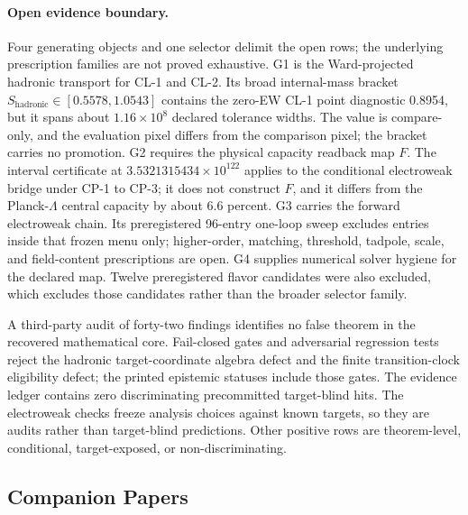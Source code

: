 \documentclass[11pt]{article}
\begin{document}
\paragraph{Open evidence boundary.}
Four generating objects and one selector delimit the open rows; the underlying prescription
families are not proved exhaustive. G1 is the
Ward-projected hadronic transport for CL-1 and CL-2. Its broad internal-mass bracket
\(S_{\mathrm{hadronic}}\in[0.5578,1.0543]\) contains the zero-EW CL-1 point diagnostic 0.8954,
but it spans about \(1.16\times10^8\) declared tolerance widths. The value is compare-only,
and the evaluation pixel differs from the comparison pixel; the bracket carries no promotion.
G2 requires the physical capacity readback map \(F\). The interval
certificate at \(3.5321315434\times10^{122}\) applies to the conditional electroweak bridge under
CP-1 to CP-3; it does not construct \(F\), and it differs from the Planck-\(\Lambda\) central
capacity by about \(6.6\) percent. G3 carries the forward electroweak chain. Its preregistered
96-entry one-loop sweep excludes entries inside that frozen menu only; higher-order, matching,
threshold, tadpole, scale, and field-content prescriptions are open. G4 supplies numerical
solver hygiene for the declared map. Twelve preregistered flavor candidates were also excluded,
which excludes those candidates rather than the broader selector family.

A third-party audit of forty-two findings identifies no false theorem in the recovered
mathematical core. Fail-closed gates and adversarial regression tests reject the hadronic
target-coordinate algebra defect and the finite transition-clock eligibility defect; the printed
epistemic statuses include those gates.
The evidence ledger contains zero discriminating precommitted target-blind hits. The electroweak checks
freeze analysis choices against known targets, so they are audits rather than target-blind
predictions. Other positive rows are theorem-level, conditional, target-exposed, or
non-discriminating.

\subsection*{Companion Papers}
\end{document}

